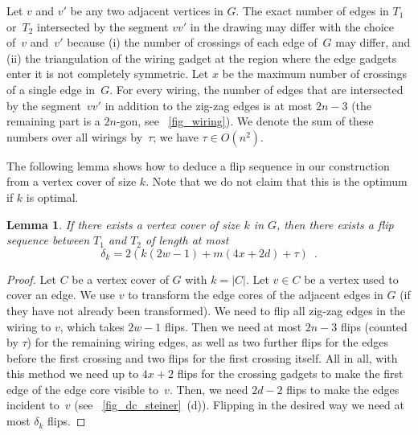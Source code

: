 \documentclass[11pt,a4paper]{article}
\newtheorem{lemma}[theorem]{Lemma}
\begin{document}
Let $v$ and $v'$ be any two adjacent vertices in $G$.
The exact number of edges in $T_1$ or~$T_2$ intersected by the segment $vv'$ in the drawing may differ with the choice of~$v$ and~$v'$ because (i) the number of crossings of each edge of~$G$ may differ, and (ii) the triangulation of the wiring gadget at the region where the edge gadgets enter it is not completely symmetric.
Let $x$ be the maximum number of crossings of a single edge in~$G$.
For every wiring, the number of edges that are intersected by the segment~$vv'$ in addition to the zig-zag edges is at most $2n-3$ (the remaining part is a $2n$-gon, see \figurename~\ref{fig_wiring}).
We denote the sum of these numbers over all wirings by~$\tau$; we have $\tau \in O(n^2)$.


The following lemma shows how to deduce a flip sequence in our construction from a vertex cover of size $k$.
Note that we do not claim that this is the optimum if $k$ is optimal.
\begin{lemma}\label{lem_flip_from_cover}
If there exists a vertex cover of size $k$ in $G$, then there exists a flip sequence between $T_1$ and $T_2$ of length at most
\begin{equation*}
\delta_k = 2(k(2w-1) + m(4x + 2d) + \tau) \enspace .
\end{equation*}
\end{lemma}
\begin{proof}
Let $C$ be a vertex cover of $G$ with $k = |C|$.
Let $v \in C$ be a vertex used to cover an edge.
We use $v$ to transform the edge cores of the adjacent edges in $G$ (if they have not already been transformed).
We need to flip all zig-zag edges in the wiring to $v$, which takes $2w-1$ flips.
Then we need at most $2n-3$ flips (counted by $\tau$) for the remaining wiring edges, as well as two further flips for the edges before the first crossing and two flips for the first crossing itself.
All in all, with this method we need up to $4x+2$ flips for the crossing gadgets to make the first edge of the edge core visible to~$v$.
Then, we need $2d-2$ flips to make the edges incident to~$v$ (see \figurename~\ref{fig_dc_steiner}~(d)).
Flipping in the desired way we need at most $\delta_k$ flips.
\end{proof}
\end{document}
